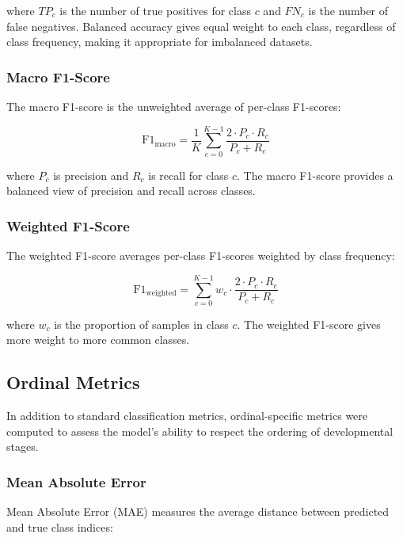 where $TP_c$ is the number of true positives for class $c$ and $FN_c$ is the number of false negatives. Balanced accuracy gives equal weight to each class, regardless of class frequency, making it appropriate for imbalanced datasets.

\subsubsection{Macro F1-Score}

The macro F1-score is the unweighted average of per-class F1-scores:

\begin{equation}
    \text{F1}_{\text{macro}} = \frac{1}{K} \sum_{c=0}^{K-1} \frac{2 \cdot P_c \cdot R_c}{P_c + R_c}
    \label{eq:macro_f1}
\end{equation}

where $P_c$ is precision and $R_c$ is recall for class $c$. The macro F1-score provides a balanced view of precision and recall across classes.

\subsubsection{Weighted F1-Score}

The weighted F1-score averages per-class F1-scores weighted by class frequency:

\begin{equation}
    \text{F1}_{\text{weighted}} = \sum_{c=0}^{K-1} w_c \cdot \frac{2 \cdot P_c \cdot R_c}{P_c + R_c}
    \label{eq:weighted_f1}
\end{equation}

where $w_c$ is the proportion of samples in class $c$. The weighted F1-score gives more weight to more common classes.

\subsection{Ordinal Metrics}

In addition to standard classification metrics, ordinal-specific metrics were computed to assess the model's ability to respect the ordering of developmental stages.

\subsubsection{Mean Absolute Error}

Mean Absolute Error (MAE) measures the average distance between predicted and true class indices:

